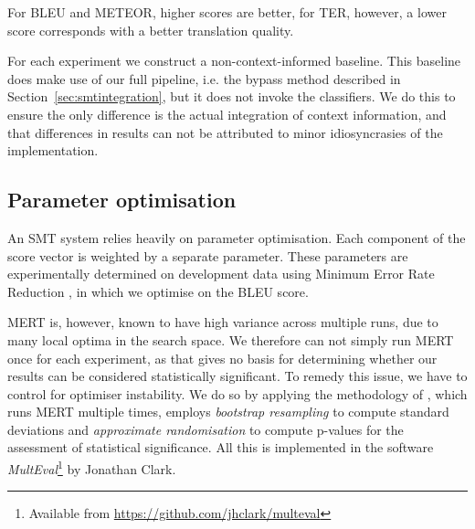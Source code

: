 For BLEU and METEOR, higher scores are better, for TER, however, a lower score
corresponds with a better translation quality.

For each experiment we construct a non-context-informed baseline. This
baseline does make use of our full pipeline, i.e. the bypass method described
in Section~\ref{sec:smtintegration}, but it does not invoke the
classifiers.  We do this to ensure the only difference is the actual
integration of context information, and that differences in results can not be
attributed to minor idiosyncrasies of the implementation.


\subsection{Parameter optimisation}
\label{sec:paropt}

An SMT system relies heavily on parameter optimisation. Each component of the
score vector is weighted by a separate parameter. These parameters are
experimentally determined on development data using Minimum Error Rate
Reduction \citep{MERT}, in which we optimise on the BLEU score.


MERT is, however, known to have high variance across multiple runs, due to many
local optima in the search space. We therefore can not simply run MERT once for
each experiment, as that gives no basis for determining whether our results can
be considered statistically significant. To remedy this issue, we have to
control for optimiser instability. We do so by applying the methodology of
\cite{MERTCONTROL}, which runs MERT multiple times, employs \emph{bootstrap
resampling} to compute standard deviations and \emph{approximate randomisation}
to compute p-values for the assessment of statistical significance. All this is
implemented in the software \emph{MultEval}\footnote{Available from
\url{https://github.com/jhclark/multeval}} by Jonathan Clark.

